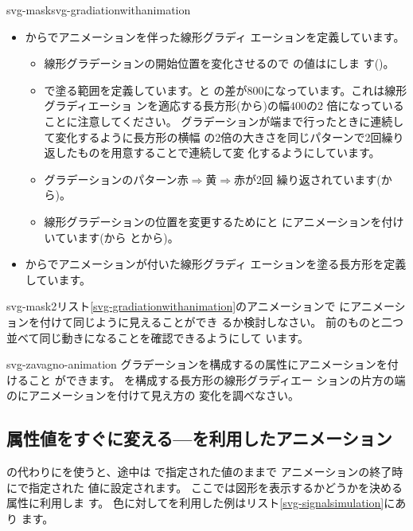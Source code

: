      {svg-mask}{svg-gradiationwithanimation}
\begin{itemize}
 \item {}からでアニメーションを伴った線形グラディ
       エーションを定義しています。
\begin{itemize}
 \item 線形グラデーションの開始位置を変化させるので
       の値はにしま
       す()。
 \item {}で塗る範囲を定義しています。と
       の差が$800$になっています。これは線形グラディエーショ
       ンを適応する長方形(から)の幅$400$の$2$
       倍になっていることに注意してください。
グラデーションが端まで行ったときに連続して変化するように長方形の横幅
の2倍の大きさを同じパターンで2回繰り返したものを用意することで連続して変
       化するようにしています。

 \item グラデーションのパターン$赤\Rightarrow 黄\Rightarrow 赤$が2回
       繰り返されています(から)。
 \item 線形グラデーションの位置を変更するためにと
       にアニメーションを付けいています(から
       とから)。
\end{itemize}
 \item {}からでアニメーションが付いた線形グラディ
       エーションを塗る長方形を定義しています。
\end{itemize}

{svg-mask2}{リスト\ref{svg-gradiationwithanimation}のアニメーションで
 にアニメーションを付けて同じように見えることができ
 るか検討しなさい。}
{前のものと二つ並べて同じ動きになることを確認できるようにして
 います。}

{svg-zavagno-animation}
{グラデーションを構成するの属性にアニメーションを付けること
ができます。
を構成する長方形の線形グラディエー
 ションの片方の端のにアニメーションを付けて見え方の
 変化を調べなさい。}

\subsection{属性値をすぐに変える---を利用したアニメーション}
\label{visibility-hidden}
の代わりにを使うと、途中は
で指定された値のままで
アニメーションの終了時にで指定された
値に設定されます。
ここでは図形を表示するかどうかを決める属性に利用しま
す。
%
色に対してを利用した例はリスト\ref{svg-signalsimulation}にあり
ます。%

